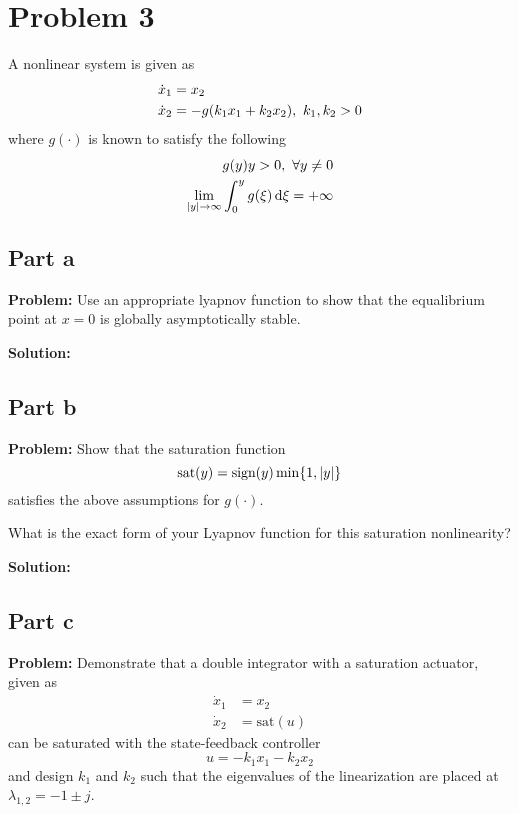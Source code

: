 \documentclass[letter]{article}
\begin{document}
\section{Problem 3}
A nonlinear system is given as
\begin{equation}
	\begin{aligned}
		\dot{x}_1 &= x_2\\
		\dot{x}_2 &= -g \qty(k_1 x_1 + k_2 x_2), \ k_1, k_2 > 0
	\end{aligned}
\end{equation}
where $g(\cdot)$ is known to satisfy the following
\begin{equation}
	\begin{aligned}
		g(y) y > 0, \ \forall y \neq 0\\
		\lim_{\abs{y} \to \infty} \int_0^y g(\xi) \dd{\xi}  = + \infty
	\end{aligned}
\end{equation}

\subsection{Part a}
\textbf{Problem:}
Use an appropriate lyapnov function to show that the equalibrium point at $x=0$ is globally asymptotically stable.

\noindent
\textbf{Solution:}









\subsection{Part b}
\textbf{Problem:}
Show that the saturation function $$\text{sat}(y) = \text{sign}(y) \min \{1, \abs{y}\}$$ satisfies the above assumptions for $g(\cdot)$.

What is the exact form of your Lyapnov function for this saturation nonlinearity?

\textbf{Solution:}







\newpage
\subsection{Part c}
\textbf{Problem:}
Demonstrate that a double integrator with a saturation actuator, given as
\begin{equation}
	\begin{aligned}
		\dot{x}_1 &= x_2\\
		\dot{x}_2 &= \text{sat}(u)
	\end{aligned}
\end{equation}
can be saturated with the state-feedback controller $$ u = -k_1 x_1 - k_2 x_2$$ and design $k_1$ and $k_2$ such that the eigenvalues of the linearization are placed at $\lambda_{1,2} = -1 \pm j$.
\end{document}
